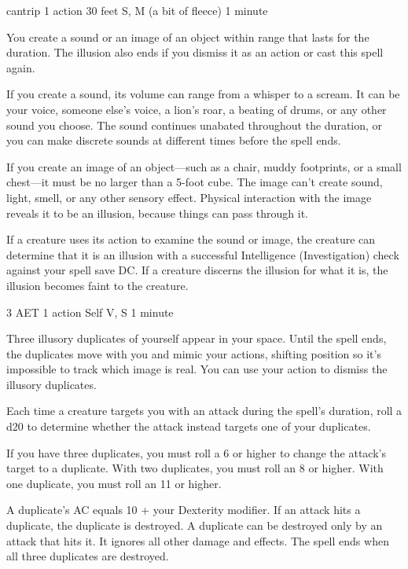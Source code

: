 \label{spell:minor-illusion}
{cantrip}
{1 action}
{30 feet}
{S, M (a bit of fleece)}
{1 minute}

You create a sound or an image of an object within range that lasts for the duration. The illusion also ends if you dismiss it as an action or cast this spell again.

If you create a sound, its volume can range from a whisper to a scream. It can be your voice, someone else's voice, a lion's roar, a beating of drums, or any other sound you choose. The sound continues unabated throughout the duration, or you can make discrete sounds at different times before the spell ends.

If you create an image of an object—such as a chair, muddy footprints, or a small chest—it must be no larger than a 5-foot cube. The image can't create sound, light, smell, or any other sensory effect. Physical interaction with the image reveals it to be an illusion, because things can pass through it.

If a creature uses its action to examine the sound or image, the creature can determine that it is an illusion with a successful Intelligence (Investigation) check against your spell save DC. If a creature discerns the illusion for what it is, the illusion becomes faint to the creature.

\label{spell:mirror-image}
{3 AET}
{1 action}
{Self}
{V, S}
{1 minute}

Three illusory duplicates of yourself appear in your space. Until the spell ends, the duplicates move with you and mimic your actions, shifting position so it's impossible to track which image is real. You can use your action to dismiss the illusory duplicates.

Each time a creature targets you with an attack during the spell's duration, roll a d20 to determine whether the attack instead targets one of your duplicates.

If you have three duplicates, you must roll a 6 or higher to change the attack's target to a duplicate. With two duplicates, you must roll an 8 or higher. With one duplicate, you must roll an 11 or higher.

A duplicate's AC equals 10 + your Dexterity modifier. If an attack hits a duplicate, the duplicate is destroyed. A duplicate can be destroyed only by an attack that hits it. It ignores all other damage and effects. The spell ends when all three duplicates are destroyed.

